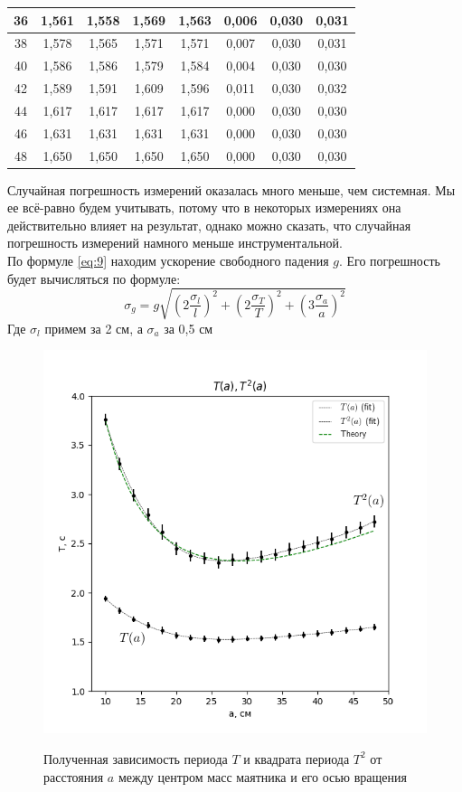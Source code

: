 \documentclass[a4paper,12pt]{article}
\begin{document}
\begin{table}[H]
\begin{tabular}{|c|c|c|c|c|c|c|c|}
			\hline
			36 & 1,561 & 1,558 & 1,569 & 1,563 & 0,006 & 0,030 & 0,031 \\
			\hline
			38 & 1,578 & 1,565 & 1,571 & 1,571 & 0,007 & 0,030 & 0,031 \\
			\hline
			40 & 1,586 & 1,586 & 1,579 & 1,584 & 0,004 & 0,030 & 0,030 \\
			\hline
			42 & 1,589 & 1,591 & 1,609 & 1,596 & 0,011 & 0,030 & 0,032 \\
			\hline
			44 & 1,617 & 1,617 & 1,617 & 1,617 & 0,000 & 0,030 & 0,030 \\
			\hline
			46 & 1,631 & 1,631 & 1,631 & 1,631 & 0,000 & 0,030 & 0,030 \\
			\hline
			48 & 1,650 & 1,650 & 1,650 & 1,650 & 0,000 & 0,030 & 0,030 \\
			\hline
		\end{tabular}
	\end{table}

	\noindent
	Случайная погрешность измерений оказалась много меньше, чем системная. Мы ее всё-равно будем учитывать, потому что в некоторых измерениях она действительно влияет на результат, однако можно сказать, что случайная погрешность измерений намного меньше инструментальной.\\
	\noindent
	По формуле \eqref{eq:9} находим ускорение свободного падения $g$.
	Его погрешность будет вычисляться по формуле:
	\begin{equation}
		\label{eq:13}
		\sigma_g=g\sqrt{\left(2\frac{\sigma_l}{l}\right)^2+\left(2\frac{\sigma_T}{T}\right)^2+\left(3\frac{\sigma_a}{a}\right)^2}
	\end{equation}
	Где $\sigma_l$ примем за 2 см, а $\sigma_a$ за 0,5 см
	
	\begin{figure}[H]
		\centering
		\caption{Полученная зависимость периода $T$ и квадрата периода $T^2$ от расстояния $a$ между центром масс маятника и его осью вращения}
		\includegraphics[width=0.9\linewidth]{fig2}
		\label{fig:fig2}
	\end{figure}
	
\end{document}
